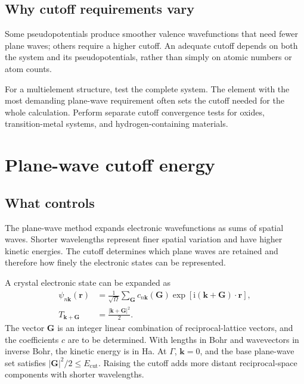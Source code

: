 \subsection{Why cutoff requirements vary}

Some pseudopotentials produce smoother valence wavefunctions that need fewer plane waves; others require a higher cutoff. An adequate cutoff depends on both the system and its pseudopotentials, rather than simply on atomic numbers or atom counts.

For a multielement structure, test the complete system. The element with the most demanding plane-wave requirement often sets the cutoff needed for the whole calculation. Perform separate cutoff convergence tests for oxides, transition-metal systems, and hydrogen-containing materials.

\section{Plane-wave cutoff energy}

\subsection{What  controls}

The plane-wave method expands electronic wavefunctions as sums of spatial waves. Shorter wavelengths represent finer spatial variation and have higher kinetic energies. The cutoff determines which plane waves are retained and therefore how finely the electronic states can be represented.

A crystal electronic state can be expanded as
\begin{equation}
  \begin{aligned}
  \psi_{n\mathbf k}(\mathbf r)
   &=\frac{1}{\sqrt{\Omega}}\sum_{\mathbf G}
      c_{n\mathbf k}(\mathbf G)
      \exp\!\left[\mathrm i(\mathbf k+\mathbf G)\cdot\mathbf r\right],\\
  T_{\mathbf k+\mathbf G}&=\frac{|\mathbf k+\mathbf G|^2}{2}.
  \end{aligned}
  \label{eq:plane-wave-expansion}
\end{equation}
The vector $\mathbf G$ is an integer linear combination of reciprocal-lattice vectors, and the coefficients $c$ are to be determined. With lengths in Bohr and wavevectors in inverse Bohr, the kinetic energy is in Ha. At $\Gamma$, $\mathbf k=0$, and the base plane-wave set satisfies $|\mathbf G|^2/2\leq E_{\mathrm{cut}}$. Raising the cutoff adds more distant reciprocal-space components with shorter wavelengths.

